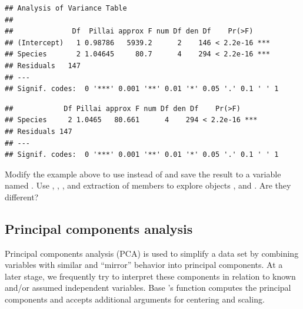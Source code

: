 \documentclass[krantz2]{krantz}\usepackage{knitr}
\begin{document}
\begin{knitrout}\footnotesize
{}\color{fgcolor}\begin{kframe}
\begin{alltt}
 \hlkwb{<-} \hlstd{(} \hlopt{~}    
\end{alltt}
\begin{verbatim}
## Analysis of Variance Table
##
##              Df  Pillai approx F num Df den Df    Pr(>F)
## (Intercept)   1 0.98786   5939.2      2    146 < 2.2e-16 ***
## Species       2 1.04645     80.7      4    294 < 2.2e-16 ***
## Residuals   147
## ---
## Signif. codes:  0 '***' 0.001 '**' 0.01 '*' 0.05 '.' 0.1 ' ' 1
\end{verbatim}
\begin{alltt}
\end{alltt}
\begin{verbatim}
##            Df Pillai approx F num Df den Df    Pr(>F)
## Species     2 1.0465   80.661      4    294 < 2.2e-16 ***
## Residuals 147
## ---
## Signif. codes:  0 '***' 0.001 '**' 0.01 '*' 0.05 '.' 0.1 ' ' 1
\end{verbatim}
\end{kframe}
\end{knitrout}

\begin{advplayground}
Modify the example above to use  instead of  and save the result to a variable named .
Use , , ,  and extraction of members to explore objects ,  and . Are they different?
\end{advplayground}


\subsection{Principal components analysis}\label{sec:stat:PCA}

Principal components analysis (PCA) is used to simplify a data set by combining variables with similar and ``mirror'' behavior into principal components. At a later stage, we frequently try to interpret these components in relation to known and/or assumed independent variables. Base \Rlang's function  computes the principal components and accepts additional arguments for centering and scaling.
\end{document}
